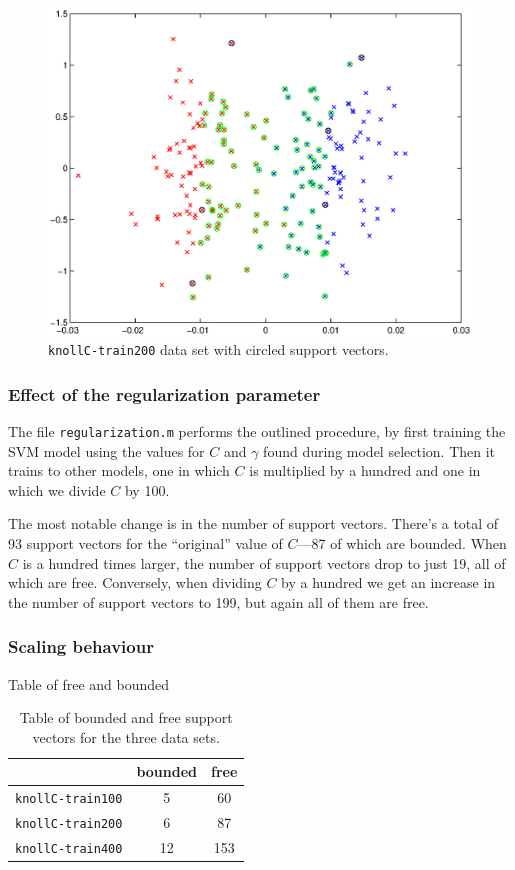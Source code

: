\documentclass{article}
\begin{document}
\begin{figure}[!ht]
  \centering
  \includegraphics[width=.8\textwidth]{Code/freeBoundedSVs.eps}
  \caption{\texttt{knollC-train200} data set with circled support vectors.}
  \label{fig:freebounded}
\end{figure}

\subsubsection{Effect of the regularization parameter}


The file \texttt{regularization.m} performs the outlined procedure, by first training the SVM model using the values for $C$ and $\gamma$ found during model selection. Then it trains to other models, one in which $C$ is multiplied by a hundred and one in which we divide $C$ by 100.

The most notable change is in the number of support vectors. There's a total of 93 support vectors for the ``original'' value of $C$---87 of which are bounded. When $C$ is a hundred times larger, the number of support vectors drop to just 19, all of which are free. Conversely, when dividing $C$ by a hundred we get an increase in the number of support vectors to 199, but again all of them are free.

\subsubsection{Scaling behaviour}

Table of free and bounded 

\begin{table}[h!]
  \centering
  \begin{tabular}{l | c | c}
    \hfill & bounded & free\\\hline
    \texttt{knollC-train100} & 5 & 60 \\
    \texttt{knollC-train200} & 6 & 87 \\
    \texttt{knollC-train400} & 12 & 153 \\
  \end{tabular}
  \caption{Table of bounded and free support vectors for the three data sets.}
  \label{tab:knoll_free_bounded_SV}
\end{table}
\end{document}
